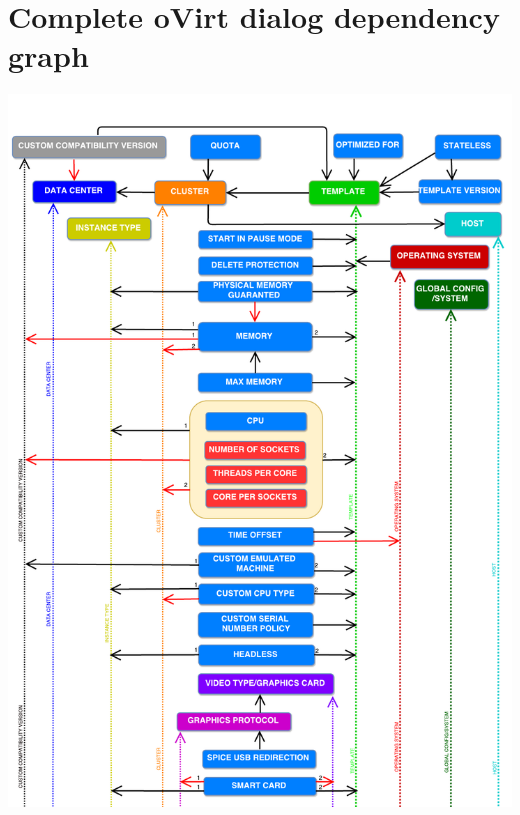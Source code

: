 \chapter{Complete oVirt dialog dependency graph} \label{graph}
\newpage
\includegraphics[page=1, width=1.05\textwidth, angle=0]{DependencyGraph}
\newpage
